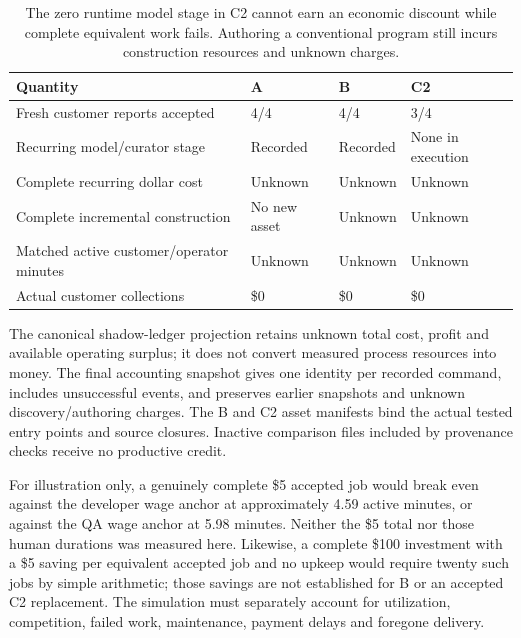 \begin{table}[htbp]
\centering\small
\begin{tabularx}{\textwidth}{Xlll}
\toprule
Quantity & A & B & C2\\
\midrule
Fresh customer reports accepted & 4/4 & 4/4 & 3/4\\
Recurring model/curator stage & Recorded & Recorded & None in execution\\
Complete recurring dollar cost & Unknown & Unknown & Unknown\\
Complete incremental construction & No new asset & Unknown & Unknown\\
Matched active customer/operator minutes & Unknown & Unknown & Unknown\\
Actual customer collections & \$0 & \$0 & \$0\\
\bottomrule
\end{tabularx}
\caption{The zero runtime model stage in C2 cannot earn an economic discount while complete equivalent work fails. Authoring a conventional program still incurs construction resources and unknown charges.}
\end{table}

The canonical shadow-ledger projection retains unknown total cost, profit and available operating surplus; it does not convert measured process resources into money. The final accounting snapshot gives one identity per recorded command, includes unsuccessful events, and preserves earlier snapshots and unknown discovery/authoring charges. The B and C2 asset manifests bind the actual tested entry points and source closures. Inactive comparison files included by provenance checks receive no productive credit.

For illustration only, a genuinely complete \$5 accepted job would break even against the developer wage anchor at approximately 4.59 active minutes, or against the QA wage anchor at 5.98 minutes. Neither the \$5 total nor those human durations was measured here. Likewise, a complete \$100 investment with a \$5 saving per equivalent accepted job and no upkeep would require twenty such jobs by simple arithmetic; those savings are not established for B or an accepted C2 replacement. The simulation must separately account for utilization, competition, failed work, maintenance, payment delays and foregone delivery.

